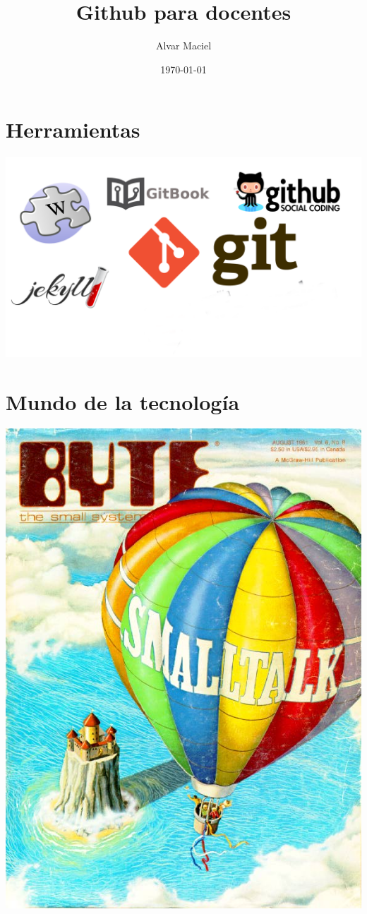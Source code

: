\documentclass[11pt]{article}
\author{Alvar Maciel}
\date{\today}
\title{Github para docentes}
\begin{document}
\maketitle
\tableofcontents


\section{Herramientas}
\label{sec:orgheadline1}
\includegraphics[width=.9\linewidth]{pictures/PortadaBlancoLogos2.png}
\section{Mundo de la tecnología}
\label{sec:orgheadline2}

\includegraphics[width=.9\linewidth]{pictures/bytebloon.jpg}
\end{document}
